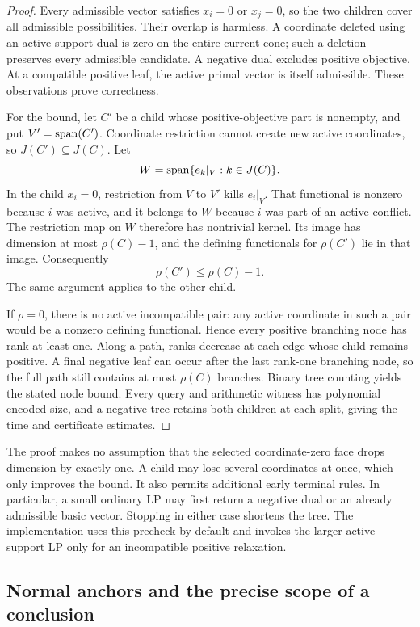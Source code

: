 \begin{proof}
Every admissible vector satisfies $x_i=0$ or $x_j=0$, so the two children cover
all admissible possibilities.  Their overlap is harmless.  A coordinate
deleted using an active-support dual is zero on the entire current cone;
such a deletion preserves every admissible candidate.  A negative dual
excludes positive objective.  At a compatible positive leaf, the active
primal vector is itself admissible.  These observations prove correctness.

For the bound, let $C'$ be a child whose positive-objective part is nonempty,
and put $V'=\operatorname{span}(C')$.  Coordinate restriction cannot create new active
coordinates, so $J(C')\subseteq J(C)$.  Let
\[
 W=\operatorname{span}\{e_k|_V:k\in J(C)\}.
\]
In the child $x_i=0$, restriction from $V$ to $V'$ kills $e_i|_V$.  That
functional is nonzero because $i$ was active, and it belongs to $W$ because
$i$ was part of an active conflict.  The restriction map on $W$ therefore
has nontrivial kernel.  Its image has dimension at most $\rho(C)-1$, and
the defining functionals for $\rho(C')$ lie in that image.  Consequently
\[
 \rho(C')\le\rho(C)-1.
\]
The same argument applies to the other child.

If $\rho=0$, there is no active incompatible pair: any active coordinate in
such a pair would be a nonzero defining functional.  Hence every positive
branching node has rank at least one.  Along a path, ranks decrease at each
edge whose child remains positive.  A final negative leaf can occur after
the last rank-one branching node, so the full path still contains at most
$\rho(C)$ branches.  Binary tree counting yields the stated node bound.
Every query and arithmetic witness has polynomial encoded size, and a
negative tree retains both children at each split, giving the time and
certificate estimates.
\end{proof}

The proof makes no assumption that the selected coordinate-zero face drops
dimension by exactly one.  A child may lose several coordinates at once,
which only improves the bound.  It also permits additional early terminal
rules.  In particular, a small ordinary LP may first return a negative dual
or an already admissible basic vector.  Stopping in either case shortens the
tree.  The implementation uses this precheck by default and invokes the
larger active-support LP only for an incompatible positive relaxation.

\subsection{Normal anchors and the precise scope of a conclusion}

